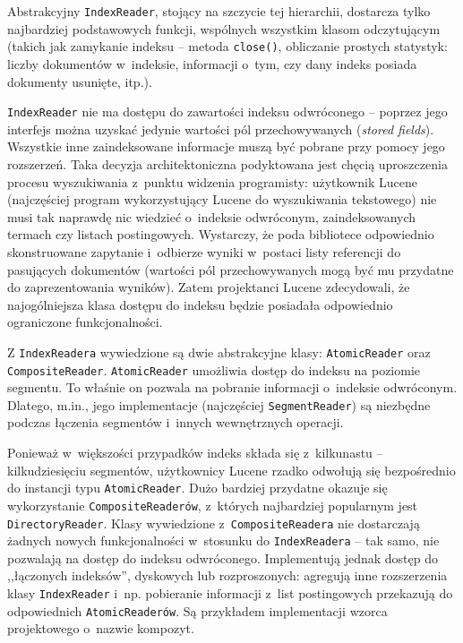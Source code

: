 Abstrakcyjny \texttt{IndexReader}, stojący na szczycie tej hierarchii, dostarcza tylko najbardziej podstawowych funkcji, wspólnych wszystkim klasom odczytującym (takich jak zamykanie indeksu -- metoda \texttt{close()}, obliczanie prostych statystyk: liczby dokumentów w~indeksie, informacji o~tym, czy dany indeks posiada dokumenty usunięte, itp.). 

\texttt{IndexReader} nie ma dostępu do zawartości indeksu odwróconego -- poprzez jego interfejs można uzyskać jedynie wartości pól przechowywanych (\emph{stored fields}). Wszystkie inne zaindeksowane informacje muszą być pobrane przy pomocy jego rozszerzeń. Taka decyzja architektoniczna podyktowana jest chęcią uproszczenia procesu wyszukiwania z~punktu widzenia programisty: użytkownik Lucene (najczęściej program wykorzystujący Lucene do wyszukiwania tekstowego) nie musi tak naprawdę nic wiedzieć o~indeksie odwróconym, zaindeksowanych termach czy listach postingowych. Wystarczy, że poda bibliotece odpowiednio skonstruowane zapytanie i~odbierze wyniki w~postaci listy referencji do pasujących dokumentów (wartości pól przechowywanych mogą być mu przydatne do zaprezentowania wyników). Zatem projektanci Lucene zdecydowali, że najogólniejsza klasa dostępu do indeksu będzie posiadała odpowiednio ograniczone funkcjonalności.

Z \texttt{IndexReadera} wywiedzione są dwie abstrakcyjne klasy: \texttt{AtomicReader} oraz \texttt{CompositeReader}. \texttt{AtomicReader} umożliwia dostęp do indeksu na poziomie segmentu. To właśnie on pozwala na pobranie informacji o~indeksie odwróconym. Dlatego, m.in., jego implementacje (najczęściej \texttt{SegmentReader}) są niezbędne podczas łączenia segmentów i~innych wewnętrznych operacji.

Ponieważ w~większości przypadków indeks składa się z~kilkunastu -- kilkudziesięciu segmentów, użytkownicy Lucene rzadko odwołują się bezpośrednio do instancji typu \texttt{AtomicReader}. Dużo bardziej przydatne okazuje się wykorzystanie \texttt{CompositeReaderów}, z~których najbardziej popularnym jest \texttt{DirectoryReader}. Klasy wywiedzione z~\texttt{CompositeReadera} nie dostarczają żadnych nowych funkcjonalności w~stosunku do \texttt{IndexReadera} -- tak samo, nie pozwalają na dostęp do indeksu odwróconego. Implementują jednak dostęp do ,,łączonych indeksów'', dyskowych lub rozproszonych: agregują inne rozszerzenia klasy \texttt{IndexReader} i~np. pobieranie informacji z~list postingowych przekazują do odpowiednich \texttt{AtomicReaderów}. Są przykładem implementacji wzorca projektowego o~nazwie kompozyt.

